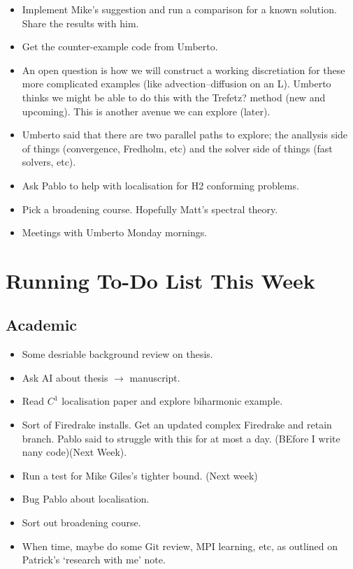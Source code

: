 \documentclass[12pt,a4paper]{article}
\begin{document}
\begin{itemize}
    \item Implement Mike's suggestion and run a comparison for a known solution. Share the results with him. 
    \item Get the counter-example code from Umberto.
    \item An open question is how we will construct a working discretiation for these more complicated examples (like advection--diffusion on an L). Umberto thinks we might be able to do this with the Trefetz? method (new and upcoming). This is another avenue we can explore (later). 
    \item Umberto said that there are two parallel paths to explore; the anallysis side of things (convergence, Fredholm, etc) and the solver side of things (fast solvers, etc). 
    \item Ask Pablo to help with localisation for H2 conforming problems. 
    \item Pick a broadening course. Hopefully Matt's spectral theory. 
    \item Meetings with Umberto Monday mornings. 
\end{itemize}


\section{Running To-Do List This Week}

\subsection{Academic}

\begin{itemize}
    \item Some desriable background review on thesis. 
    \item Ask AI about thesis $\rightarrow$ manuscript.
    \item Read $C^1$ localisation paper and explore biharmonic example. 
    \item Sort of Firedrake installs. Get an updated complex Firedrake and retain branch. Pablo said to struggle with this for at most a day. (BEfore I write nany code)(Next Week).
    \item Run a test for Mike Giles's tighter bound. (Next week)
    \item \checkmark Bug Pablo about localisation. 
    \item \checkmark Sort out broadening course. 
    \item When time, maybe do some Git review, MPI learning, etc, as outlined on Patrick's `research with me' note. 
\end{itemize}
\end{document}
